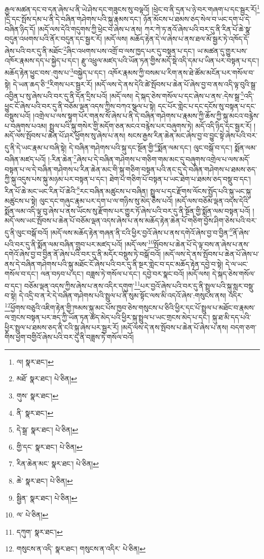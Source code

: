 རྒྱལ་མཚན་དང་བ་དན་ཞེས་པ་ནི་ཡེ་ཤེས་དང་གཟུངས་སུ་བལྟའོ། །ཕྲེང་བ་ནི་དྲན་པ་ཉེ་བར་གཞག་པ་དང་སྦྱར་རོ།\footnote{ལ།  སྣར་ཐང་། } །དྲི་དང་སྤོས་དམ་པ་ནི་དེ་བཞིན་གཤེགས་པའི་སྐུ་རྣམས་དང་། ཉོན་མོངས་པ་ཐམས་ཅད་སེལ་བ་ཡང་དག་པ་དེ་བཞིན་ཉིད་དོ། །མདོ་ལས་དེའི་གདུགས་ཀྱི་ཕྲེང་བ་ཞེས་པ་ནས། ཀར་ཀེ་ཏ་ནའོ་ཞེས་པའི་བར་དུ་ནི་རིན་པོ་ཆེ་སྣ་བདུན་འཕགས་པའི་ནོར་བདུན་དང་སྦྱར་རོ། །མདོ་ལས། མཆོད་རྟེན་དེ་ལ་ཞེས་པ་ནས་ཐལ་མོ་སྦྱར་ཏེ་འཁོད་དོ་ཞེས་པའི་བར་དུ་ནི་མཐོང་\footnote{མཐོ་  སྣར་ཐང་།  པེ་ཅིན། }ཞིང་འཕགས་པས་འགྲོ་བ་ལས་ཁྱད་པར་དུ་བསྟན་པ་དང་། ཡ་མཚན་དུ་གྱུར་པས་འཁོར་རྣམས་དད་པ་སྐྱེད་པ་དང་། རྫུ་འཕྲུལ་མཛད་པའི་ཡོན་ཏན་གྱིས་མདོ་སྡེ་འདི་དམ་པ་ཡིན་པར་བསྟན་པ་དང་། མཆོད་རྟེན་ཕྱུང་བས་:གུས་པ་\footnote{གུས་  སྣར་ཐང་། }བསྐྱེད་པ་དང་། འཁོར་རྣམས་ཀྱི་བསམ་པ་རིག་ནས་ཐེ་ཚོམ་མངོན་པར་གསོལ་བ་སྟེ། དེ་ཡན་ཆད་ཅི་\footnote{ནི་  སྣར་ཐང་། }རིགས་པར་སྦྱར་རོ། །མདོ་ལས་དེ་ནས་དེའི་ཚེ་སྤོབས་པ་ཆེན་པོ་ཞེས་བྱ་བ་ནས་འདི་ལྟ་བུའི་སྒྲ་འབྱིན་པ་སུ་ཞེས་པའི་བར་དུ་ནི་དོན་དྲིས་པའོ། །མདོ་ལས། དེ་སྐད་ཅེས་གསོལ་པ་དང་ཞེས་པ་ནས་:དེས་སྒྲ་\footnote{དེ་སྒྲ་  སྣར་ཐང་།  པེ་ཅིན། }འདི་ཕྱུང་ངོ་ཞེས་པའི་བར་དུ་ནི་བཅོམ་ལྡན་འདས་ཀྱིས་བཀའ་སྩལ་པ་སྟེ། དང་པོར་གླེང་པ་དང་དངོས་སུ་བསྟན་པ་དང་བསྡུས་པའོ། །འགྲེལ་པ་ལས་སྟུག་པོར་གནས་སོ་ཞེས་པ་ནི་དེ་བཞིན་གཤེགས་པ་རྣམས་ཀྱི་ཆོས་ཀྱི་སྐུ་མངའ་བརྙེས་པ་བཞུགས་པའམ། སྤྲུལ་པའི་སྐུ་གསེར་གྱི་མདོག་ཅན་མངའ་བརྙེས་པར་བཞུགས་ཏེ། མདོ་འདི་ཉིད་དང་སྦྱར་རོ། །མདོ་ལས་སྤོབས་པ་ཆེན་པོ་ཤར་ཕྱོགས་སུ་ཞེས་པ་ནས། སངས་རྒྱས་རིན་ཆེན་མང་ཞེས་བྱ་བ་བྱུང་སྟེ་ཞེས་པའི་བར་དུ་ནི་དེ་ཡང་རྣམ་པ་བཞི་སྟེ། དེ་བཞིན་གཤེགས་པའི་སྐུ་དང་སྔོན་གྱི་\footnote{གྱི་དང་  སྣར་ཐང་།  པེ་ཅིན། }སྨོན་ལམ་དང་། ལུང་བསྒོ་བ་དང་། སྨོན་ལམ་བཞིན་མཛད་པའོ། །:རིན་ཆེན་\footnote{རིན་ཆེན་མང་  སྣར་ཐང་།  པེ་ཅིན། }ཞེས་པ་དེ་བཞིན་གཤེགས་པ་གཅིག་གམ་མང་དུ་བཞུགས་འགྲེལ་པ་ལས་མདོ་བསྟན་པ་ལ་དེ་བཞིན་གཤེགས་པ་རིན་ཆེན་མང་གི་སྐུ་གཅིག་བསྟན་པའི་ནང་དུ་དེ་བཞིན་གཤེགས་པ་ཐམས་ཅད་ཀྱི་སྐུ་འདུས་པས་སྐུ་མཉམ་པར་བསྟན་པ་དང་། ཐེག་པ་གཅིག་པོ་བསྟན་པ་ཡང་ཐེག་པ་ཐམས་ཅད་བསྡུ་བ་དང་། རིན་པོ་ཆེ་མང་ཡང་རིན་པོ་ཆེའི་\footnote{ཆེ་  སྣར་ཐང་།  པེ་ཅིན། }རང་བཞིན་མཚུངས་པ་བཞིན། སྤྲུལ་པ་དང་རྫོགས་ལོངས་སྤྱོད་པའི་སྐུ་ཡང་སྐུ་མཚུངས་པ་སྟེ། ལུང་དང་གཞུང་རྣམ་པར་དག་པ་ལ་གཉིས་སུ་མེད་ཅེས་པའོ། །མདོ་ལས་བཅོམ་ལྡན་འདས་དེའི་སྨོན་ལམ་འདི་ལྟ་བུ་ཞེས་པ་ནས་ཡོངས་སུ་རྫོགས་པར་གྱུར་ཏོ་ཞེས་པའི་བར་དུ་ནི་སྔོན་གྱི་སྨོན་ལམ་བསྟན་པའོ། །མདོ་ལས་ཡང་སྤོབས་པ་ཆེན་པོ་བཅོམ་ལྡན་འདས་ཞེས་པ་ནས་མཆོད་རྟེན་ཆེན་པོ་གཅིག་བྱོས་ཤིག་ཅེས་པའི་བར་དུ་ནི་ལུང་བསྒོ་བའོ། །མདོ་ལས་མཆོད་རྟེན་གཞན་ནི་ངའི་ཕྱིར་བྱའོ་ཞེས་པ་ནས་དགེའོ་ཞེས་བྱ་བ་བྱིན་\footnote{སྦྱིན་  སྣར་ཐང་།  པེ་ཅིན། }ནོ་ཞེས་པའི་བར་དུ་ནི་སྨོན་ལམ་བཞིན་གྲུབ་པར་མཛད་པའོ། །མདོ་ལས་\footnote{ལ་  པེ་ཅིན། }སྤོབས་པ་ཆེན་པོ་དེ་ལྟ་བས་ན་ཞེས་པ་ནས་དགེའོ་ཞེས་བྱ་བ་བྱིན་ནོ་ཞེས་པའི་བར་དུ་ནི་མདོར་བསྡུས་ཏེ་བསྒོ་བའོ། །མདོ་ལས་དེ་ནས་སྤོབས་པ་ཆེན་པོ་ཞེས་པ་ནས་དེ་བཞིན་གཤེགས་པའི་སྐུ་མཐོང་ངོ་ཞེས་པའི་བར་དུ་ནི་སྔར་གླེང་བ་དང་མཆོད་རྟེན་དབྱེ་བ་སྟེ། དེ་ལ་ཡང་གསོལ་བ་དང་། ལན་བཏབ་པ་དང་། བཟླས་ཏེ་གསོལ་པ་དང་། དབྱེ་བར་སྣང་བའོ། །མདོ་ལས། དེ་སྐད་ཅེས་གསོལ་བ་དང་། བཅོམ་ལྡན་འདས་ཀྱིས་ཞེས་པ་ནས་འདིར་དགུག་\footnote{དཀུག་  སྣར་ཐང་། }པར་བྱའོ་ཞེས་པའི་བར་དུ་ནི་སྤྲུལ་པའི་སྐུ་སླར་བསྡུ་བ་སྟེ། དེ་འདྲི་བ་ན་རེ་དེ་བཞིན་གཤེགས་པའི་སྤྲུལ་པ་ནི་སུམ་སྟོང་ལས་མི་འདའོ་ཞེས་:གསུངས་ནས། འདིར་\footnote{གསུངས་ན་འདི་  སྣར་ཐང་། གསུངས་ན་འདིར་  པེ་ཅིན། }ཕྱོགས་བཅུའི་འཇིག་རྟེན་གྱི་ཁམས་སྐུ་མང་པོས་ཁྱབ་ཅེས་གསུངས་པ་ཅིའི་ཕྱིར་དང་པོ་སྤྲུལ་པ་མཐོང་བ་རྣམས་ལ་གྲངས་བསྟན་པར་ཟད་ཀྱི་ཡོན་ཏན་ཚད་མེད་པའི་ཕྱིར་སྐུ་སྤྲུལ་པ་ཡང་གྲངས་མེད་པ་དང་། སྐུ་ཐ་མི་དད་པའི་ཕྱིར་སྤྲུལ་པ་ཐམས་ཅད་ནི་ངའི་སྐུ་ཞེས་པར་སྦྱར་རོ། །མདོ་ལས་དེ་ནས་སྤོབས་པ་ཆེན་པོ་ཞེས་པ་ནས། བདག་ཅག་གིས་ཕྱག་བགྱིའོ་ཞེས་པའི་བར་དུ་ནི་བཟླས་ཏེ་གསོལ་བའོ། 